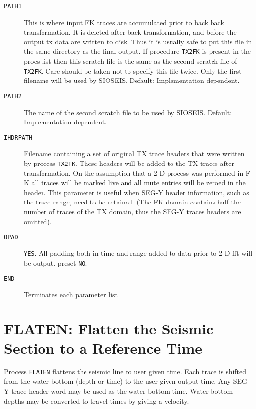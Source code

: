 \begin{description}
\item[\texttt{PATH1}] This is where input FK traces are accumulated prior to back back
           transformation. It is deleted after back transformation, and before
           the output tx data are written to disk.  Thus it is usually safe to
           put this file in the same directory as the final output.  If
           procedure \texttt{TX2FK} is present in the procs list then this scratch file
           is the same as the second scratch file of \texttt{TX2FK}. Care should be taken
           not to specify this file twice. Only the first filename will be used
           by SIOSEIS.
           Default: Implementation dependent.

\item[\texttt{PATH2}] The name of the second scratch file to be used by SIOSEIS.
           Default: Implementation dependent.

\item[\texttt{IHDRPATH}] Filename containing a set of original TX trace headers that were
           written by process \texttt{TX2FK}. These headers will be added to the TX
           traces after transformation. On the assumption that a 2-D process was
           performed in F-K all traces will be marked live and all mute entries
           will be zeroed in the header.  This parameter is useful when
           SEG-Y header information, such as the trace range, need to be
           retained.  (The FK domain contains half the number of traces
           of the TX domain, thus the SEG-Y traces headers are omitted).

\item[\texttt{OPAD}] \texttt{YES}. All padding both in time and range added to data prior to 2-D
           \gls{fft} will be output.
           \Gls{preset} \texttt{NO}.

\item[\texttt{END}] Terminates each parameter list
\end{description}

\section{FLATEN: Flatten the Seismic Section to a Reference Time}
\label{cmd_flaten}

Process \texttt{FLATEN} flattens the seismic line to user given time.  Each trace
is shifted from the water bottom (depth or time) to the user given output
time.  Any SEG-Y trace header word may be used as the water bottom time.
Water bottom depths may be converted to travel times by giving a velocity.

